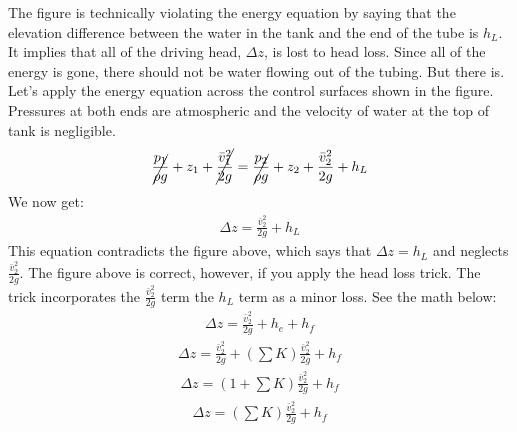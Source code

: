 \documentclass[letterpaper,10pt,english]{sphinxmanual}
\begin{document}
The figure is technically violating the energy equation by saying that the elevation difference between the water in the tank and the end of the tube is \(h_L\). It implies that all of the driving head, \(\Delta z\), is lost to head loss. Since all of the energy is gone, there should not be water flowing out of the tubing. But there is. Let’s apply the energy equation across the control surfaces shown in the figure. Pressures at both ends are atmospheric and the velocity of water at the top of tank is negligible.
\begin{equation}\label{equation:Review/Review_Fluid_Mechanics:Review/Review_Fluid_Mechanics:15}
\begin{split}\cancel{ \frac{p_{1}}{\rho g} } + z_{1} + \cancel{ \frac{\bar v_{1}^2}{2g} } = \cancel{ \frac{p_{2}}{\rho g} } + z_{2} + \frac{\bar v_{2}^2}{2g} + h_L\end{split}
\end{equation}
We now get:
\begin{equation}\label{equation:Review/Review_Fluid_Mechanics:Review/Review_Fluid_Mechanics:16}
\begin{split}\Delta z = \frac{\bar v_2^2}{2g} + h_L\end{split}
\end{equation}
This equation contradicts the figure above, which says that \(\Delta z = h_L\) and neglects \(\frac{\bar v_2^2}{2g}\). The figure above is correct, however, if you apply the head loss trick. The trick incorporates the \(\frac{\bar v_2^2}{2g}\) term  the \(h_L\) term as a minor loss. See the math below:
\begin{equation}\label{equation:Review/Review_Fluid_Mechanics:Review/Review_Fluid_Mechanics:17}
\begin{split}\Delta z = \frac{\bar v_2^2}{2g} + h_e + h_f\end{split}
\end{equation}\begin{equation}\label{equation:Review/Review_Fluid_Mechanics:Review/Review_Fluid_Mechanics:18}
\begin{split}\Delta z = \frac{\bar v_2^2}{2g} + \left( \sum K \right) \frac{\bar v_2^2}{2g} + h_f\end{split}
\end{equation}\begin{equation}\label{equation:Review/Review_Fluid_Mechanics:Review/Review_Fluid_Mechanics:19}
\begin{split}\Delta z = \left( 1 + \sum K \right) \frac{\bar v_2^2}{2g} + h_f\end{split}
\end{equation}\begin{equation}\label{equation:Review/Review_Fluid_Mechanics:Review/Review_Fluid_Mechanics:20}
\begin{split}\Delta z = \left( \sum K \right) \frac{\bar v_2^2}{2g} + h_f\end{split}
\end{equation}
\end{document}
